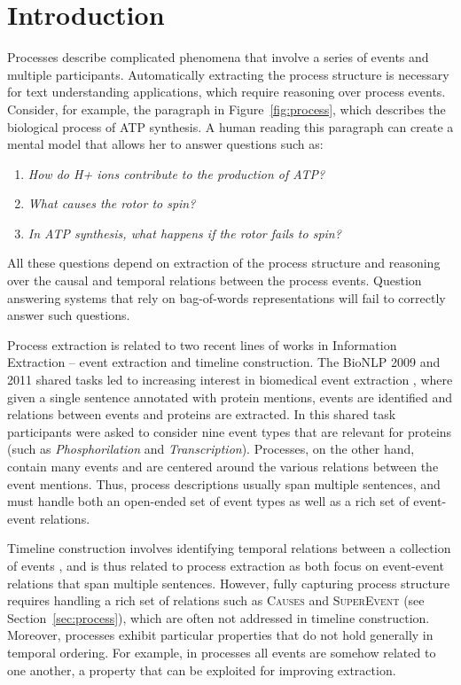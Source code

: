 \section{Introduction}

Processes describe complicated phenomena that involve a series of events and multiple participants. Automatically extracting the process structure is necessary for text understanding applications, which require reasoning over process events. Consider, for example, the paragraph in Figure~\ref{fig:process}, which describes the biological process of ATP synthesis. A human reading this paragraph can create a mental model that allows her to answer questions such as:

\begin{enumerate}[itemsep=0pt,topsep=0pt] 
\item \emph{How do H+ ions contribute to the production of ATP?}
\item \emph{What causes the rotor to spin?}
\item \emph{In ATP synthesis, what happens if the rotor fails to spin?}
\end{enumerate}

\noindent All these questions depend on extraction of the process structure and reasoning over the causal and temporal relations between the process events. Question answering systems that rely on bag-of-words representations will fail to correctly answer such questions.


Process extraction is related to two recent lines of works in Information Extraction -- event extraction and timeline construction. The BioNLP 2009 and 2011 shared tasks \cite{kim09,kim11} led to increasing interest in biomedical event extraction \cite{Poon10,Miwa10,riedel11fast,Mcclosky11,Bjorne11}, where given a single sentence annotated with protein mentions, events  are identified and relations between events and proteins are extracted. In this shared task participants were asked to consider nine event types that are relevant for proteins (such as \emph{Phosphorilation} and \emph{Transcription}). Processes, on the other hand, contain many events and are centered around the various relations between the event mentions. Thus, process descriptions usually span multiple sentences, and must handle both an open-ended set of event types as well as a rich set of event-event relations.

Timeline construction involves identifying temporal relations between a collection of events \cite{Chambers08,Yoshikawa09,Denis11,Do12,Mcclosky12}, and is thus related to process extraction as both focus on event-event relations that span multiple sentences. However, fully capturing process structure requires handling a rich set of relations such as \textsc{Causes} and \textsc{SuperEvent} (see Section~\ref{sec:process}), which are often not addressed in timeline construction. Moreover, processes exhibit particular properties that do not hold generally in temporal ordering. For example, in processes all events are somehow related to one another, a property that can be exploited for improving extraction.

